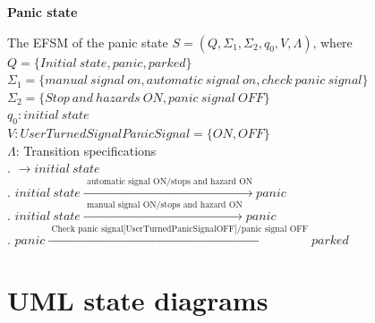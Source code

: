 \documentclass[12pt]{article}
\begin{document}
\begin{spacing}{1.5}
\newpage
\noindent \textbf{Panic state}

\noindent The EFSM of the panic state $S = (Q, \Sigma_1, \Sigma_2, q_0, V, \Lambda)$, where\\

\noindent $Q = \{Initial~state,panic,parked\}$\\
\noindent $\Sigma_1 = \{manual~signal~on,automatic~signal~on,check~panic~signal\}$\\
\noindent $\Sigma_2 = \{Stop~and~hazards~ON,panic~signal~OFF\}$\\
\noindent $q_0: initial~state$\\
\noindent $V: UserTurnedSignalPanicSignal = \{ON, OFF\}$\\
\noindent $\Lambda$: Transition specifications\\
. $\rightarrow initial~state$\\
. $initial~state \xrightarrow {\text { automatic~signal~ON/stops~and~hazard~ON}} panic$\\
. $initial~state \xrightarrow {\text { manual~signal~ON/stops~and~hazard~ON}} panic$\\
. $panic \xrightarrow {\text { Check~panic~signal[UserTurnedPanicSignalOFF]/panic~signal~OFF}} parked$\\

\newpage




\newpage
\section{UML state diagrams}


\end{spacing}
\end{document}
